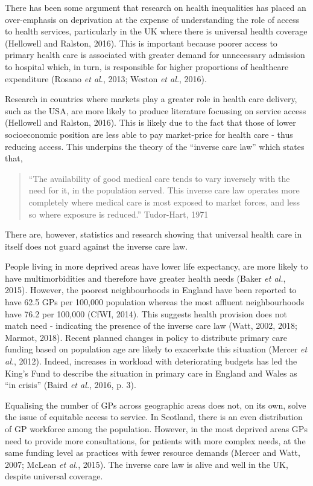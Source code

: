 \documentclass[12pt,a4paper,oneside,table]{report}
\begin{document}
There has been some argument that research on health inequalities has
placed an over-emphasis on deprivation at the expense of understanding
the role of access to health services, particularly in the UK where
there is universal health coverage (Hellowell and Ralston, 2016). This
is important because poorer access to primary health care is associated
with greater demand for unnecessary admission to hospital which, in
turn, is responsible for higher proportions of healthcare expenditure
(Rosano \emph{et al.}, 2013; Weston \emph{et al.}, 2016).

Research in countries where markets play a greater role in health care
delivery, such as the USA, are more likely to produce literature
focussing on service access (Hellowell and Ralston, 2016). This is
likely due to the fact that those of lower socioeconomic position are
less able to pay market-price for health care - thus reducing access.
This underpins the theory of the ``inverse care law'' which states that,

\begin{quotation} ``The availability of good medical care tends to vary inversely with the need for it, in the population served. This inverse care law operates more completely where medical care is most exposed to market forces, and less so where exposure is reduced.'' \hfill{Tudor-Hart, 1971}\end{quotation}

There are, however, statistics and research showing that universal
health care in itself does not guard against the inverse care law.

People living in more deprived areas have lower life expectancy, are
more likely to have multimorbidities and therefore have greater health
needs (Baker \emph{et al.}, 2015). However, the poorest neighbourhoods
in England have been reported to have 62.5 GPs per 100,000 population
whereas the most affluent neighbourhoods have 76.2 per 100,000 (CfWI,
2014). This suggests health provision does not match need - indicating
the presence of the inverse care law (Watt, 2002, 2018; Marmot, 2018).
Recent planned changes in policy to distribute primary care funding
based on population age are likely to exacerbate this situation (Mercer
\emph{et al.}, 2012). Indeed, increases in workload with deteriorating
budgets has led the King's Fund to describe the situation in primary
care in England and Wales as ``in crisis'' (Baird \emph{et al.}, 2016,
p. 3).

Equalising the number of GPs across geographic areas does not, on its
own, solve the issue of equitable access to service. In Scotland, there
is an even distribution of GP workforce among the population. However,
in the most deprived areas GPs need to provide more consultations, for
patients with more complex needs, at the same funding level as practices
with fewer resource demands (Mercer and Watt, 2007; McLean \emph{et
al.}, 2015). The inverse care law is alive and well in the UK, despite
universal coverage.
\end{document}

